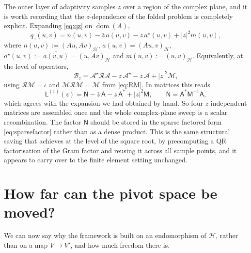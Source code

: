 \documentclass[11pt,a4paper]{article}
\theoremstyle{plain}
\newcommand{\abs}[1]{\left|#1\right|}
\newcommand{\Hb}{\mathcal{H}}
\newcommand{\Vb}{V}
\newcommand{\Aop}{\mathcal{A}}
\newcommand{\Bop}{\mathcal{B}}
\DeclareMathOperator{\dom}{dom}
\newcommand{\adj}{\star}                 %
\newcommand{\Riesz}{\mathcal{R}}         %
\newcommand{\Mass}{\mathcal{M}}          %
\begin{document}
The outer layer of adaptivity samples $z$ over a region of the complex plane,
and it is worth recording that the $z$-dependence of the folded problem is
completely explicit.  Expanding \cref{eq:qz} on $\dom(A)$,
\begin{equation}
  \label{eq:zaffineform}
  q_z(u,v) = n(u,v) - \bar z\, a(u,v) - z\, a^{\adj}(u,v)
             + \abs{z}^2 m(u,v),
\end{equation}
where $n(u,v) := (Au,Av)_{\Hb}$, $a(u,v) = (Au,v)_{\Hb}$, $a^{\adj}(u,v) :=
\overline{a(v,u)} = (u,Av)_{\Hb}$ and $m(u,v) := (u,v)_{\Hb}$.  Equivalently, at
the level of operators,
\begin{equation}
  \label{eq:zaffineop}
  \Bop_z = \Aop^{\adj}\Riesz\Aop - z\,\Aop^{\adj} - \bar z\,\Aop
           + \abs{z}^2 \Mass ,
\end{equation}
using $\Riesz\Mass = \iota$ and $\Mass\Riesz\Mass = \Mass$ from \cref{eq:RM}.
In matrices this reads
\begin{equation}
  \label{eq:zaffinemat}
  \mathsf{L}^{(1)}(z) = \mathsf{N} - \bar z\,\mathsf{A} - z\,\mathsf{A}^{*}
    + \abs{z}^2\mathsf{M},
  \qquad
  \mathsf{N} = \mathsf{A}^{*}\mathsf{M}^{-1}\mathsf{A} ,
\end{equation}
which agrees with the expansion we had obtained by hand.  So four
$z$-independent matrices are assembled once and the whole complex-plane sweep is
a scalar recombination.  The factor $\mathsf{N}$ should be stored in the sparse
factored form \cref{eq:sparsefactor} rather than as a dense product.  This is
the same structural saving that \cite[Algorithm~3.5]{Colbrook2026} achieves at
the level of the square root, by precomputing a QR factorisation of the Gram
factor and reusing it across all sample points, and it appears to carry over to
the finite element setting unchanged.

\section{How far can the pivot space be moved?}
\label{sec:pivot}

We can now say why the framework is built on an endomorphism of $\Hb$, rather
than on a map $\Vb \to \Vb'$, and how much freedom there is.
\end{document}
